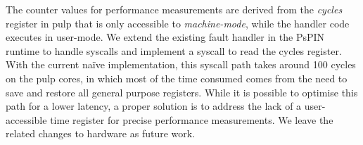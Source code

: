 The counter values for performance measurements are derived from the \emph{cycles} register in \ac{pulp} that is only accessible to \emph{machine-mode}, while the handler code executes in user-mode.  We extend the existing fault handler in the PsPIN runtime to handle syscalls and implement a syscall to read the cycles register.  With the current na\"ive implementation, this syscall path takes around 100 cycles on the \ac{pulp} cores, in which most of the time consumed comes from the need to save and restore all general purpose registers.  While it is possible to optimise this path for a lower latency, a proper solution is to address the lack of a user-accessible time register for precise performance measurements.  We leave the related changes to hardware as future work.